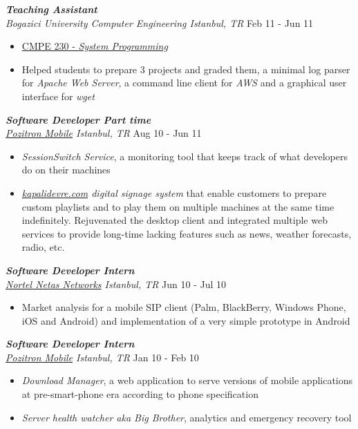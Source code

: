 \documentclass[line, margin]{res}
\begin{document}
\begin{resume}
	{\sl \textbf{Teaching Assistant} \\ Bogazici University Computer Engineering Istanbul, TR} \hfill Feb 11 - Jun 11 \\
	\vspace{-.3cm} 
	\begin{itemize} \itemsep -2pt
		\item \href{http://www.cmpe.boun.edu.tr/courses/?cmpe=230}{CMPE 230 - \textit{System Programming}}
		\item Helped students to prepare 3 projects and graded them, a minimal log parser for \textit{Apache Web Server}, a command line client for \textit{AWS} and a graphical user interface for \textit{wget}
	\end{itemize}

	{\sl \textbf{Software Developer Part time} \\ \href{http://www.pozitron.com/}{Pozitron Mobile} Istanbul, TR} \hfill Aug 10 - Jun 11 \\
	\vspace{-0.3cm}
	\begin{itemize} \itemsep -2pt
		\item \textit{SessionSwitch Service}, a monitoring tool that keeps track of what developers do on their machines
		\item \textit{\href{http://kapalidevre.com}{kapalidevre.com} digital signage system} that enable customers to prepare custom playlists and to play them on multiple machines at the same time indefinitely. Rejuvenated the desktop client and integrated multiple web services to provide long-time lacking features such as news, weather forecasts, radio, etc.
	\end{itemize}

	{\sl \textbf{Software Developer Intern} \\ \href{http://netas.com.tr/en}{Nortel Netas Networks} Istanbul, TR} \hfill Jun 10 - Jul 10 \\
	\vspace{-0.3cm}
	\begin{itemize} \itemsep -2pt
		\item Market analysis for a mobile SIP client (Palm, BlackBerry, Windows Phone, iOS and Android) and implementation of a very simple prototype in Android
	\end{itemize}

	{\sl \textbf{Software Developer Intern} \\ \href{http://www.pozitron.com/}{Pozitron Mobile} Istanbul, TR} \hfill Jan 10 - Feb 10 \\
	\vspace{-0.3cm}
	\begin{itemize} \itemsep -2pt
		\item \textit{Download Manager}, a web application to serve versions of mobile applications at pre-smart-phone era according to phone specification
		\item \textit{Server health watcher aka Big Brother}, analytics and emergency recovery tool
	\end{itemize}							


\end{resume}
\end{document}
